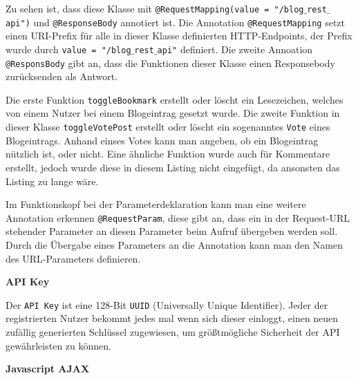 \documentclass[paper=a4,12pt]{scrreprt}
\begin{document}
Zu sehen ist, dass diese Klasse mit \texttt{@RequestMapping(value = "/blog$\_$rest$\_$api")} und \texttt{@ResponseBody} annotiert ist. Die Annotation \texttt{@RequestMapping} setzt einen URI-Prefix für alle
in dieser Klasse definierten HTTP-Endpoints, der Prefix wurde durch \texttt{value = "/blog$\_$rest$\_$api"} definiert. Die zweite Annoation \texttt{@ResponsBody} gibt an, dass die Funktionen dieser Klasse einen Responsebody zurücksenden als Antwort.\newline

Die erste Funktion \texttt{toggleBookmark} erstellt oder löscht ein Lesezeichen, welches von einem Nutzer bei einem Blogeintrag gesetzt wurde.\newline
Die zweite Funktion in dieser Klasse \texttt{toggleVotePost} erstellt oder löscht ein sogenanntes \texttt{Vote} eines Blogeintrags. Anhand einses Votes kann man angeben, ob ein Blogeintrag
nützlich ist, oder nicht. Eine ähnliche Funktion wurde auch für Kommentare erstellt, jedoch wurde diese in diesem Listing nicht eingefügt, da ansonsten das Listing zu lange wäre.\newline

Im Funktionskopf bei der Parameterdeklaration kann man eine weitere Annotation erkennen \texttt{@RequestParam}, diese gibt an, dass ein in der Request-URL stehender Parameter an diesen Parameter beim Aufruf übergeben werden soll. Durch die
Übergabe eines Parameters an die Annotation kann man den Namen des URL-Parameters definieren.\newline

\textbf{API Key}

Der \texttt{API Key} ist eine 128-Bit \texttt{UUID} (Universally Unique Identifier). Jeder der registrierten Nutzer bekommt jedes mal wenn sich dieser einloggt, einen neuen zufällig generierten Schlüssel zugewiesen, um größtmögliche Sicherheit der API gewährleisten zu können.\newline


\textbf{Javascript AJAX}
\end{document}
